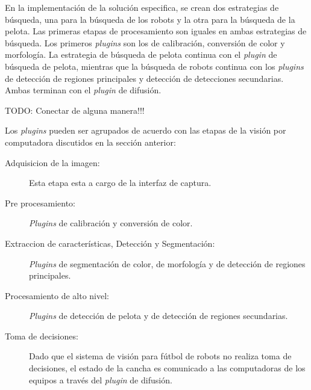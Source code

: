 En la implementación de la solución especifica, se crean dos estrategias de
búsqueda, una para la búsqueda de los robots y la otra para la búsqueda de la
pelota. Las primeras etapas de procesamiento son iguales en ambas estrategias de
búsqueda. Los primeros \emph{plugins} son los de calibración, conversión de
color y morfología. La estrategia de búsqueda de pelota continua con el
\emph{plugin} de búsqueda de pelota, mientras que la búsqueda de robots continua
con los \emph{plugins} de detección de regiones principales y detección de
detecciones secundarias. Ambas terminan con el \emph{plugin} de difusión.

TODO: Conectar de alguna manera!!!

Los \emph{plugins} pueden ser agrupados de acuerdo con las etapas de la visión
por computadora discutidos en la sección anterior:

\begin{description}

	\item[Adquisicion de la imagen:] Esta etapa esta a cargo de la interfaz
		de captura.

	\item[Pre procesamiento:] \emph{Plugins} de calibración y conversión de
		color.

	\item[Extraccion de características, Detección y Segmentación:]
		\emph{Plugins} de segmentación de color, de morfología y de
		detección de regiones principales.

	\item[Procesamiento de alto nivel:] \emph{Plugins} de detección de
		pelota y de detección de regiones secundarias.

	\item[Toma de decisiones:] Dado que el sistema de visión para fútbol de
		robots no realiza toma de decisiones, el estado de la cancha es
		comunicado a las computadoras de los equipos a través del
		\emph{plugin} de difusión.

\end{description}
